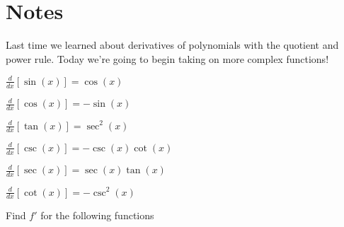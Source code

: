 \documentclass[addpoints]{exam}
\theoremstyle{definition}
\theoremstyle{plain}
\begin{document}
\section{Notes}
Last time we learned about derivatives of polynomials with the quotient and power rule. Today we're going to begin taking on more complex functions! 
\begin{tcolorbox}[breakable, title=\subsection{DERIVATIVES OF TRIG FUNCTIONS}, colframe=black, sharp corners, colback=Azure4!70, colbacktitle=DodgerBlue3!60, coltitle=black]
    \begin{enumerate}
        \begin{minipage}{0.45\linewidth}
            \item $\displaystyle \frac{d}{dx}\left[\sin\left(x\right)\right] = \cos\left(x\right)$   
            \item $\displaystyle \frac{d}{dx}\left[\cos\left(x\right)\right] = -\sin\left(x\right)$   
            \item $\displaystyle \frac{d}{dx}\left[\tan\left(x\right)\right] = \sec^2\left(x\right)$   
        \end{minipage}
        \hfill 
        \begin{minipage}{0.45\linewidth}
            \item $\displaystyle \frac{d}{dx}\left[\csc\left(x\right)\right] = -\csc\left(x\right)\cot\left(x\right)$   
            \item $\displaystyle \frac{d}{dx}\left[\sec\left(x\right)\right] = \sec\left(x\right)\tan\left(x\right)$   
            \item $\displaystyle \frac{d}{dx}\left[\cot\left(x\right)\right] = -\csc^{2}\left(x\right)$   
        \end{minipage}
    \end{enumerate}
\end{tcolorbox}
Find $f'$ for the following functions
\end{document}
